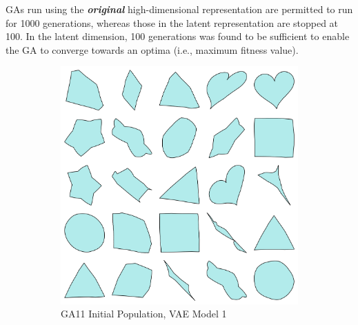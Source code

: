 \documentclass{article}
\begin{document}
GAs run using the \textbf{\textit{original}} high-dimensional representation are permitted to run for 1000 generations, whereas those in the latent representation are stopped at 100. In the latent dimension, 100 generations was found to be sufficient to enable the GA to converge towards an optima (i.e., maximum fitness value).

\begin{figure}[h]
    \centering
    \begin{subfigure}[b]{0.45\textwidth}
        \centering
        \includegraphics[width=\textwidth]{figures/latent_gen_shapes/GA_11_50_init_pop.png}
        \caption{GA11 Initial Population, VAE Model 1}
        \label{fig:latent_shape_popM1}
    \end{subfigure}
    \hfill
    \begin{subfigure}[b]{0.45\textwidth}
        \centering

\end{subfigure}
\end{figure}
\end{document}
